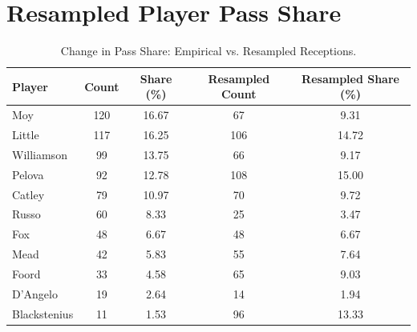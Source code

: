 \documentclass[12pt, a4paper]{article}
\begin{document}
\section{Resampled Player Pass Share}
\label{app:pass_share}


\begin{table}[htbp]
    \centering
    \small
    \caption{Change in Pass Share: Empirical vs. Resampled Receptions.}
    \label{tab:pass_share_comparison}
    \begin{tabularx}{\textwidth}{X c c c c}
        \toprule
        \textbf{Player} & \textbf{Count} & \textbf{Share (\%)} & \textbf{Resampled Count} & \textbf{Resampled Share (\%)} \\
        \midrule
        Moy & 120 & 16.67 & 67 & 9.31 \\
        Little & 117 & 16.25 & 106 & 14.72 \\
        Williamson & 99 & 13.75 & 66 & 9.17 \\
        Pelova & 92 & 12.78 & 108 & 15.00 \\
        Catley & 79 & 10.97 & 70 & 9.72 \\
        Russo & 60 & 8.33 & 25 & 3.47 \\
        Fox & 48 & 6.67 & 48 & 6.67 \\
        Mead & 42 & 5.83 & 55 & 7.64 \\
        Foord & 33 & 4.58 & 65 & 9.03 \\
        D’Angelo & 19 & 2.64 & 14 & 1.94 \\
        Blackstenius & 11 & 1.53 & 96 & 13.33 \\
        \bottomrule
    \end{tabularx}
\end{table}
\end{document}
